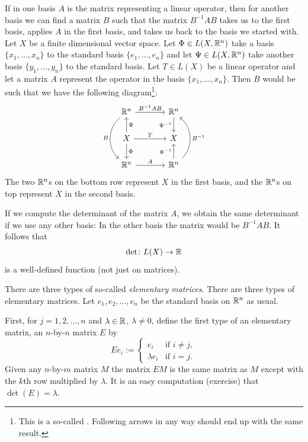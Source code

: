 If in one basis $A$ is the matrix representing a
linear operator, then for another basis we can find a matrix $B$ such
that the matrix $B^{-1}AB$ takes us to the first basis, applies $A$ in the
first basis, and takes us back to the basis we started with.
Let $X$ be a finite dimensional vector space.
Let $\Phi \in L(X,{\mathbb{R}}^n)$ take a basis $\{ x_1,\ldots,x_n \}$ to the
standard basis $\{ e_1,\ldots,e_n \}$ and let $\Psi \in L(X,{\mathbb{R}}^n)$
take another basis $\{ y_1, \ldots, y_n \}$ to the standard basis.
Let $T \in L(X)$ be a linear operator and let a matrix $A$
represent the operator
in the basis $\{ x_1,\ldots,x_n \}$.
Then $B$ would be such that we have the following diagram\footnote{%
This is a so-called \emph{}.
Following arrows in any way should end up with the same result.}:
\begin{equation*}
\begin{tikzcd}[row sep=normal,column sep=large]
\R^n \ar[r, "B^{-1}AB"]  \ar[dd, bend right=50, "B"'] &
  \R^n \ar[d, "\Psi^{-1}"'] \\
X \ar[r, "T"] \ar[u, "\Psi"'] \ar[d, "\Phi"]        &
  X \\
\R^n \ar[r, "A"]                                      &
  \R^n \ar[u, "\Phi^{-1}"] \ar[uu, bend right=50, "B^{-1}"'] 
\end{tikzcd}
\end{equation*}
The two ${\mathbb{R}}^n$s on the bottom row represent
$X$ in the first basis, and the ${\mathbb{R}}^n$s on top represent $X$ in the
second
basis.

If we compute the determinant of the matrix $A$, we obtain
the same determinant if we use any other basis:
In the other basis the matrix would be $B^{-1}AB$.
It follows that
\begin{equation*}
\det \colon L(X) \to {\mathbb{R}}
\end{equation*}
is a well-defined function (not just on matrices).

\medskip

There are three types of so-called
\emph{elementary matrices}.
There are three types of elementary matrices.
Let
$e_1,e_2,\ldots,e_n$ be the standard basis on ${\mathbb{R}}^n$ as usual.

First,
for $j =
1,2,\ldots,n$ and
$\lambda \in {\mathbb{R}}$, $\lambda \neq 0$, define
the first type of an elementary matrix,
an
$n$-by-$n$ matrix $E$ by
\begin{equation*}
Ee_i := 
\begin{cases}
e_i & \text{if } i \neq j , \\
\lambda e_i & \text{if } i = j .
\end{cases}
\end{equation*}
Given any $n$-by-$m$ matrix $M$ the matrix $EM$ is the same matrix as $M$
except with the $k$th row multiplied by $\lambda$.
It is an easy computation (exercise) that $\det(E) = \lambda$.

